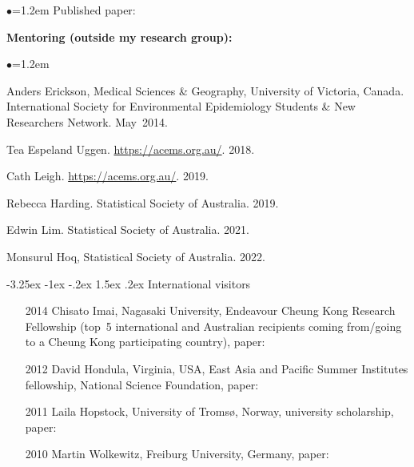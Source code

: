 \documentclass[a4paper,11pt]{article}
\makeatletter
\renewcommand\subsection{\@startsection{subsection}{2}{\z@}%
                                       {-3.25ex \@plus -1ex \@minus -.2ex}%
                                       {1.5ex \@plus .2ex}%
                                   {\normalfont\normalsize\bfseries\color{blue}}}
\renewcommand{\labelitemi}{$\bullet$}
\makeatother
\begin{document}
\begin{raggedright}
\begin{list}{\labelitemi}{\leftmargin=1.2em}
Published paper: 


% 
\end{list}

\textbf{Mentoring (outside my research group):}

\begin{list}{\labelitemi}{\leftmargin=1.2em}\addtolength{\itemsep}{-0.5\baselineskip}
\item Anders Erickson, Medical Sciences \& Geography, University of Victoria, Canada. International Society for Environmental Epidemiology Students \& New Researchers Network. May~2014.
\item Tea Espeland Uggen. \href{ACEMS}{https://acems.org.au/}. 2018.
\item Cath Leigh. \href{ACEMS}{https://acems.org.au/}. 2019.
\item Rebecca Harding. Statistical Society of Australia. 2019.
\item Edwin Lim. Statistical Society of Australia. 2021.
\item Monsurul Hoq, Statistical Society of Australia. 2022.
\end{list}

\subsection{International visitors}

\begin{itemize}%
  \item[2014] Chisato Imai, Nagasaki University, Endeavour Cheung Kong Research Fellowship (top~5 international and Australian recipients coming from/going to a Cheung Kong participating country), paper: 
  \item[2012] David Hondula, Virginia, USA, East Asia and Pacific Summer Institutes fellowship, National Science Foundation, paper: 
  \item[2011] Laila Hopstock, University of {T}roms{\o}, Norway, university scholarship, paper: 
  \item[2010] Martin Wolkewitz, Freiburg University, Germany, paper: 
\end{itemize}


\end{raggedright}
\end{document}
